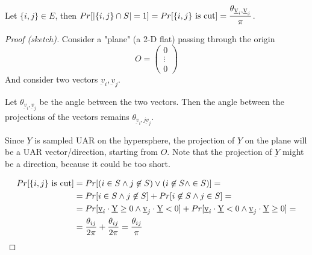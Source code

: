     \begin{lemma}\label{lemma:gw1}
        Let $\{i,j\} \in E$, then $Pr[\vert  \{i,j\} \cap S  \vert = 1] = Pr[\{i,j\} \text{ is cut}] = \dfrac{\theta_{\underbar{v}_i, \underbar{v}_j}}{\pi}$.
    \end{lemma}

    \begin{proof}[Proof (sketch)]
        Consider a "plane" (a 2-D flat) passing through the origin
        \[ O =  \begin{pmatrix}
            0\\ 
            \vdots\\
            0
          \end{pmatrix} \]
        And consider two vectors $\underbar{v}_i, \underbar{v}_j$.

        Let $\theta_{\underbar{v}_i,\underbar{v}_j}$ be the angle between the two vectors.
        Then the angle between the projections of the vectors remains $\theta_{\underbar{v}_i,j\underbar{v}_j}$.

        Since $\underbar{Y}$ is sampled UAR on the hypersphere, the projection of $\underbar{Y}$ on the plane will be a UAR vector/direction, starting from $O$.
        Note that the projection of $\underbar{Y}$ might be a direction, because it could be too short.


        \begin{equation*}
            \begin{split}
                Pr[\{i,j\} \text{ is cut}] &= Pr[(i \in S \wedge j \not\in S) \vee (i \not\in S \wedge \in S)] =\\
                    &= Pr[i \in S \wedge j \not\in S] + Pr[i \not\in S \wedge j \in S] =\\
                    &= Pr[\underbar{v}_i \cdot \underbar{Y} \geq 0 \wedge \underbar{v}_j \cdot \underbar{Y} < 0] + Pr[\underbar{v}_i \cdot \underbar{Y} < 0 \wedge \underbar{v}_j \cdot \underbar{Y} \geq 0] =\\
                    &= \dfrac{\theta_{ij}}{2 \pi} + \dfrac{\theta_{ij}}{2 \pi} = \dfrac{\theta_{ij}}{\pi}
            \end{split}
        \end{equation*}
    \end{proof}

